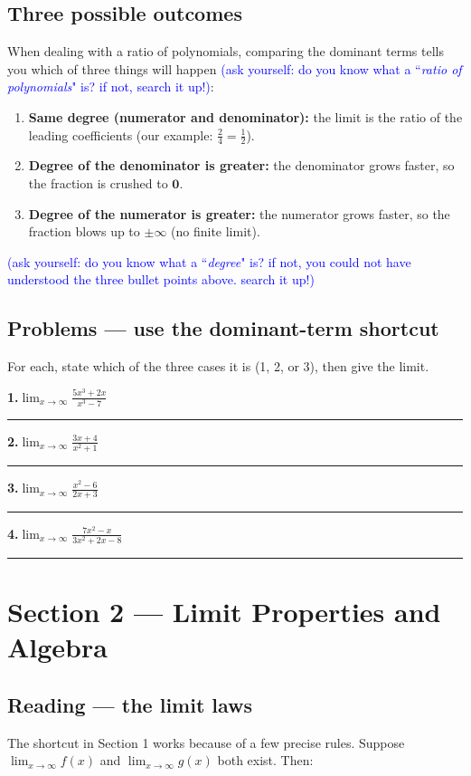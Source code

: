 \documentclass[12pt]{article}
\newcommand{\wl}{\par\vspace{5mm}\noindent\rule{\linewidth}{0.4pt}\par\vspace{1mm}}
\begin{document}
\newpage
\subsection*{Three possible outcomes}
When dealing with a ratio of polynomials, comparing the dominant terms tells you which of three things will happen \textcolor{blue}{(ask yourself: do you know what a ``\textit{ratio of polynomials}" is? if not, search it up!)}:
\begin{enumerate}
  \item \textbf{Same degree (numerator and denominator):} the limit is the ratio of the leading coefficients
        (our example: $\tfrac{2}{4} = \tfrac12$).
  \item \textbf{Degree of the denominator is greater:} the denominator grows faster, so the fraction is crushed to
        $\mathbf{0}$.
  \item \textbf{Degree of the numerator is greater:} the numerator grows faster, so the fraction blows up to
        $\boldsymbol{\pm\infty}$ (no finite limit).
\end{enumerate}
\textcolor{blue}{(ask yourself: do you know what a ``\textit{degree}" is? if not, you could not have understood the three bullet points above. search it up!)}

\subsection*{Problems --- use the dominant-term shortcut}
For each, state which of the three cases it is (1, 2, or 3), then give the limit.

\medskip
\textbf{1.}\quad $\displaystyle\lim_{x \to \infty} \frac{5x^3 + 2x}{x^3 - 7}$
\wl

\textbf{2.}\quad $\displaystyle\lim_{x \to \infty} \frac{3x + 4}{x^2 + 1}$
\wl

\textbf{3.}\quad $\displaystyle\lim_{x \to \infty} \frac{x^2 - 6}{2x + 3}$
\wl

\textbf{4.}\quad $\displaystyle\lim_{x \to \infty} \frac{7x^2 - x}{3x^2 + 2x - 8}$
\wl

\newpage
\section*{Section 2 --- Limit Properties and Algebra}

\subsection*{Reading --- the limit laws}
The shortcut in Section 1 works because of a few precise rules. Suppose $\displaystyle\lim_{x\to\infty} f(x)$ and
$\displaystyle\lim_{x\to\infty} g(x)$ both exist. Then:
\end{document}
